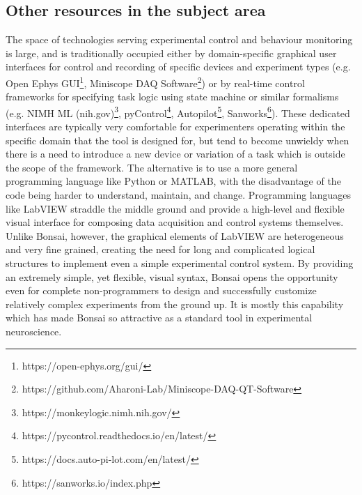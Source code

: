 \subsection*{Other resources in the subject area}

The space of technologies serving experimental control and behaviour monitoring
is large, and is traditionally occupied either by domain-specific graphical
user interfaces for control and recording of specific devices and experiment
types (e.g. Open Ephys
GUI\footnote{https://open-ephys.org/gui/},
Miniscope DAQ
Software\footnote{https://github.com/Aharoni-Lab/Miniscope-DAQ-QT-Software})
or by real-time control frameworks for specifying task logic using state
machine or similar formalisms (e.g. NIMH ML
(nih.gov)\footnote{https://monkeylogic.nimh.nih.gov/},
pyControl\footnote{https://pycontrol.readthedocs.io/en/latest/},
Autopilot\footnote{https://docs.auto-pi-lot.com/en/latest/},
Sanworks\footnote{https://sanworks.io/index.php}).
These dedicated interfaces are typically very comfortable for experimenters
operating within the specific domain that the tool is designed for, but tend to
become unwieldy when there is a need to introduce a new device or variation of
a task which is outside the scope of the framework. The alternative is to use a
more general programming language like Python or MATLAB, with the disadvantage
of the code being harder to understand, maintain, and change. Programming
languages like LabVIEW straddle the middle ground and provide a high-level and
flexible visual interface for composing data acquisition and control systems
themselves. Unlike Bonsai, however, the graphical elements of LabVIEW are
heterogeneous and very fine grained, creating the need for long and complicated
logical structures to implement even a simple experimental control system. By
providing an extremely simple, yet flexible, visual syntax, Bonsai opens the
opportunity even for complete non-programmers to design and successfully
customize relatively complex experiments from the ground up. It is mostly this
capability which has made Bonsai so attractive as a standard tool in
experimental neuroscience.

